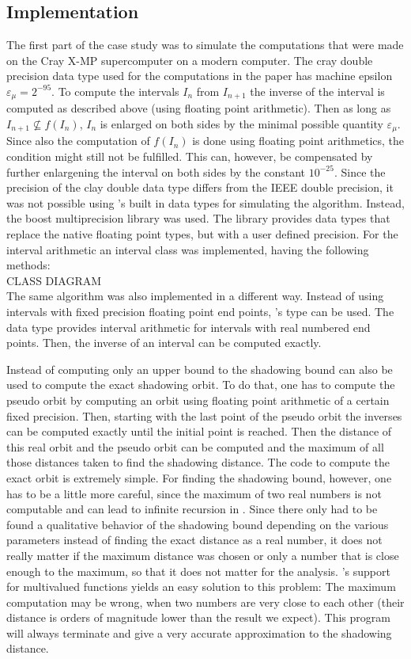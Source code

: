 \subsection{Implementation}
  The first part of the case study was to simulate the computations that were made on the Cray X-MP supercomputer on a modern computer. 
  The cray double precision data type used for the computations in the paper has machine epsilon $\varepsilon_\mu = 2^{-95}$.
  To compute the intervals $I_n$ from $I_{n+1}$ the inverse of the interval is computed as described above (using floating point arithmetic).
  Then as long as $I_{n+1} \not \subseteq f(I_n)$, $I_n$ is enlarged on both sides by the minimal possible quantity $\varepsilon_\mu$. 
  Since also the computation of $f(I_n)$ is done using floating point arithmetics, the condition might still not be fulfilled.
  This can, however, be compensated by further enlargening the interval on both sides by the constant $10^{-25}$.
  Since the precision of the clay double data type differs from the IEEE double precision, it was not possible using \cc's built in data types for simulating the algorithm.
  Instead, the boost multiprecision library \cite{boostmultiprecision} was used. 
  The library provides data types that replace the native \cc floating point types, but with a user defined precision. 
  For the interval arithmetic an interval class was implemented, having the following methods:\\
  CLASS DIAGRAM \\
  The same algorithm was also implemented in a different way. 
  Instead of using intervals with fixed precision floating point end points, \irram's  type can be used. 
  The data type provides interval arithmetic for intervals with real numbered end points.
  Then, the inverse of an interval can be computed exactly.
  
  Instead of computing only an upper bound to the shadowing bound \irram can also be used to compute the exact shadowing orbit. 
  To do that, one has to compute the pseudo orbit by computing an orbit using floating point arithmetic of a certain fixed precision.
  Then, starting with the last point of the pseudo orbit the inverses can be computed exactly until the initial point is reached.
  Then the distance of this real orbit and the pseudo orbit can be computed and the maximum of all those distances taken to find the shadowing distance.
  The \irram code to compute the exact orbit is extremely simple.
  For finding the shadowing bound, however, one has to be a little more careful, since the maximum of two real numbers is not computable and can lead to infinite recursion in \irram. 
  Since there only had to be found a qualitative behavior of the shadowing bound depending on the various parameters instead of finding the exact distance as a real number, it does not really matter if the maximum distance was chosen or only a number that is close enough to the maximum, so that it does not matter for the analysis. 
  \irram's support for multivalued functions yields an easy solution to this problem: 
  The maximum computation may be wrong, when two numbers are very close to each other (their distance is orders of magnitude lower than the result we expect). 
  This program will always terminate and give a very accurate approximation to the shadowing distance.  
